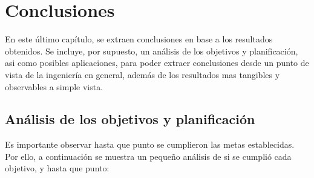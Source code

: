 \chapter{Conclusiones}

En este último capítulo, se extraen conclusiones en base a los resultados obtenidos.
Se incluye, por supuesto, un análisis de los objetivos y planificación, asi como posibles aplicaciones,
para poder extraer conclusiones desde un punto de vista de la ingeniería en general, 
además de los resultados mas tangibles y observables a simple vista.


\section{Análisis de los objetivos y planificación}

Es importante observar hasta que punto se cumplieron las metas establecidas. 
Por ello, a continuación se muestra un pequeño análisis de si se cumplió cada objetivo, 
y hasta que punto:

